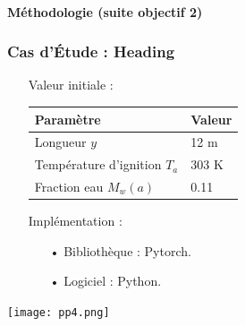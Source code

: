 \documentclass[handout]{beamer}
\newtheorem{pbm et hypo}[thm]{Problématique et hypothèses}
\begin{document}
	\begin{frame}
		\framesubtitle{\textbf{Méthodologie (suite objectif 2)}}
		\frametitle{\textbf{Cas d'Étude : Heading}}
		\begin{itemize}
			\item[\maltese] Valeur initiale :
			\begin{table}[h]
				\scriptsize
				\begin{tabular}{@{}ll@{}}
					\toprule
					\textbf{Paramètre} & \textbf{Valeur} \\
					\midrule
					\rowcolor{blue!5}
					Longueur $y$ & 12 m \\
					\rowcolor{red!5}
					Température d'ignition $T_{a}$ & 303 K \\
					\rowcolor{blue!5}
					Fraction eau $M_w(a)$ & 0.11 \\
					\bottomrule
				\end{tabular}
			\end{table}
			
			\vspace{0.2cm}
			\vspace{0.2cm}
			\item[\maltese] Implémentation : 
			\begin{itemize}
					\item[•] Bibliothèque : Pytorch.
					\vspace{0.2cm}
				\item[•] Logiciel : Python.
				
			
			\end{itemize}
		\end{itemize}
	\end{frame}
	
	
	\begin{frame}[plain]
		\noindent
		\texttt{[image: pp4.png]}
	\end{frame}
	
\end{document}
